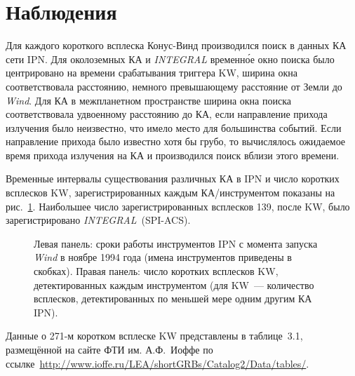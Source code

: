 \section{Наблюдения}\label{sec:IPN_catalog_obserations}
Для каждого короткого всплеска Конус-Винд производился поиск в данных КА сети IPN. 
Для околоземных КА и \textit{INTEGRAL} временн\'{о}е окно поиска было центрировано 
на времени срабатывания триггера KW, ширина окна соответствовала расстоянию, 
немного превышающему расстояние от Земли до \textit{Wind}. Для КА в межпланетном 
пространстве ширина окна поиска соответствовала удвоенному расстоянию до КА, если 
направление прихода излучения было неизвестно, что имело место для большинства событий. 
Если направление прихода было известно хотя бы грубо, то вычислялось ожидаемое время 
прихода излучения на КА и производился поиск вблизи этого времени.

Временные интервалы существования различных КА в IPN и число коротких всплесков 
KW, зарегистрированных каждым КА/инструментом показаны на рис.~\ref{img:Mission_timeline}. 
Наибольшее число зарегистрированных всплесков 139, после KW, 
было зарегистрировано \textit{INTEGRAL}~(SPI-ACS).

\begin{figure}[h]
    \caption[Время работы различных КА IPN]
  {Левая панель: сроки работы инструментов IPN с момента запуска \textit{Wind} в ноябре 1994 года 
  (имена инструментов приведены в скобках). Правая панель: число коротких всплесков KW,
  детектированных каждым инструментом (для KW~--- количество всплесков, 
  детектированных по меньшей мере одним другим КА IPN).}
  \label{img:Mission_timeline}  
\end{figure}

Данные о 271-м коротком всплеске KW представлены в таблице~3.1, размещённой 
на сайте ФТИ им. А.Ф.~Иоффе по 
ссылке~\url{http://www.ioffe.ru/LEA/shortGRBs/Catalog2/Data/tables/}.

